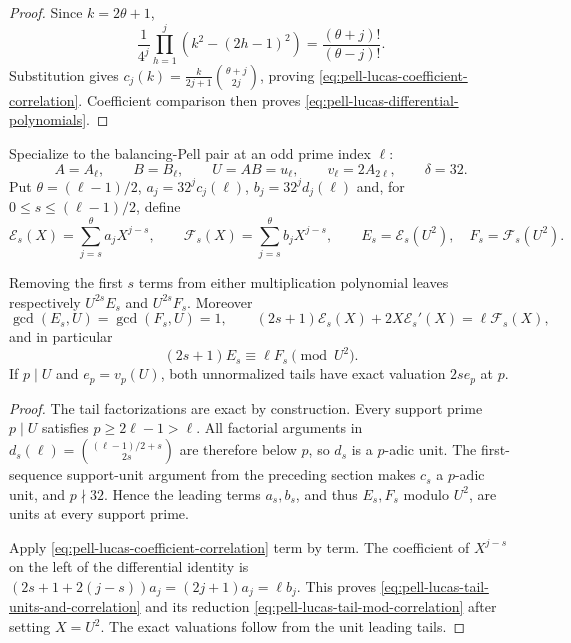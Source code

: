 \begin{proof}
Since $k=2\theta+1$,
\[
 \frac1{4^j}\prod_{h=1}^j(k^2-(2h-1)^2)
 =\frac{(\theta+j)!}{(\theta-j)!}.
\]
Substitution gives
$c_j(k)=\frac{k}{2j+1}\binom{\theta+j}{2j}$, proving
\eqref{eq:pell-lucas-coefficient-correlation}.  Coefficient comparison then
proves \eqref{eq:pell-lucas-differential-polynomials}.
\end{proof}

Specialize to the balancing-Pell pair at an odd prime index $\ell$:
\[
 A=A_\ell,\qquad B=B_\ell,\qquad U=AB=u_\ell,\qquad
 v_\ell=2A_{2\ell},\qquad \delta=32.
\]
Put $\theta=(\ell-1)/2$, $a_j=32^jc_j(\ell)$,
$b_j=32^jd_j(\ell)$ and, for
$0\le s\le(\ell-1)/2$, define
\[
 \mathcal E_s(X)=\sum_{j=s}^{\theta}a_jX^{j-s},\qquad
 \mathcal F_s(X)=\sum_{j=s}^{\theta}b_jX^{j-s},\qquad
 E_s=\mathcal E_s(U^2),\quad F_s=\mathcal F_s(U^2).
\]

\begin{theorem}
\label{thm:pell-lucas-correlated-staircase}
Removing the first $s$ terms from either multiplication polynomial leaves
respectively $U^{2s}E_s$ and $U^{2s}F_s$.  Moreover
\begin{equation}\label{eq:pell-lucas-tail-units-and-correlation}
 \gcd(E_s,U)=\gcd(F_s,U)=1,
 \qquad
 (2s+1)\mathcal E_s(X)+2X\mathcal E_s'(X)
       =\ell\mathcal F_s(X),
\end{equation}
and in particular
\begin{equation}\label{eq:pell-lucas-tail-mod-correlation}
                         (2s+1)E_s\equiv\ell F_s\pmod{U^2}.
\end{equation}
If $p\mid U$ and $e_p=v_p(U)$, both unnormalized tails have exact valuation
$2se_p$ at $p$.
\end{theorem}

\begin{proof}
The tail factorizations are exact by construction.  Every support prime
$p\mid U$ satisfies $p\ge2\ell-1>\ell$.  All factorial arguments in
$d_s(\ell)=\binom{(\ell-1)/2+s}{2s}$ are therefore below $p$, so $d_s$ is a
$p$-adic unit.  The first-sequence support-unit argument from the preceding
section makes $c_s$ a $p$-adic unit, and $p\nmid32$.  Hence the leading terms
$a_s,b_s$, and thus $E_s,F_s$ modulo $U^2$, are units at every support prime.

Apply \eqref{eq:pell-lucas-coefficient-correlation} term by term.  The
coefficient of $X^{j-s}$ on the left of the differential identity is
$(2s+1+2(j-s))a_j=(2j+1)a_j=\ell b_j$.  This proves
\eqref{eq:pell-lucas-tail-units-and-correlation} and its reduction
\eqref{eq:pell-lucas-tail-mod-correlation} after setting $X=U^2$.  The exact
valuations follow from the unit leading tails.
\end{proof}

